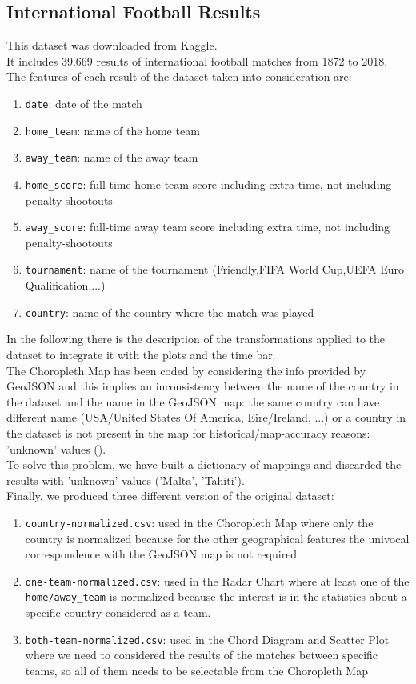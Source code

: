\documentclass[journal]{vgtc}                %
\begin{document}
\subsection{International Football Results}
This dataset was downloaded from Kaggle.\\It includes 39.669 results of international football matches  from 1872 to 2018.\\The features of each result of the dataset taken into consideration are:
\begin{enumerate}
\item \texttt{date}: date of the match
\item \texttt{home\_team}: name of the home team
\item \texttt{away\_team}: name of the away team
\item \texttt{home\_score}: full-time home team score including extra time, not including penalty-shootouts
\item \texttt{away\_score}: full-time away team score including extra time, not including penalty-shootouts
\item \texttt{tournament}: name of the tournament (Friendly,FIFA World Cup,UEFA Euro Qualification,...)
\item \texttt{country}: name of the country where the match was played
\end{enumerate}
In the following there is the description of the transformations applied to the dataset to integrate it with the plots and the time bar.\\The Choropleth Map has been coded by considering the info provided by GeoJSON and this implies an inconsistency between the name of the country in the dataset and the name in the GeoJSON map: the same country can have different name (USA/United States Of America, Eire/Ireland, ...) or a country in the dataset is not present in the map for historical/map-accuracy reasons: 'unknown' values ().\\To solve this problem, we have built a dictionary of mappings and discarded the results with 'unknown' values ('Malta', 'Tahiti').\\Finally, we produced three different version of the original dataset:
\begin{enumerate}
\item \texttt{country-normalized.csv}: used in the Choropleth Map where only the country is normalized because for the other geographical features the univocal correspondence with the GeoJSON map is not required
\item \texttt{one-team-normalized.csv}: used in the Radar Chart where at least one of the \texttt{home/away\_team} is normalized because the interest is in the statistics about a specific country considered as a team.
\item \texttt{both-team-normalized.csv}: used in the Chord Diagram and Scatter Plot where we need to considered the results of the matches between specific teams, so all of them needs to be selectable from the Choropleth Map
\end{enumerate}
\end{document}
